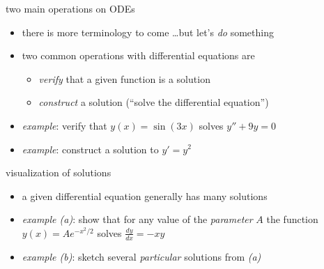 \documentclass{beamer}
\begin{document}
\begin{frame}{two main operations on ODEs}

\begin{itemize}
\item there is more terminology to come \dots but let's \emph{do} something
\item two common operations with differential equations are
    \begin{itemize}
    \item \emph{verify} that a given function is a solution
    \item \emph{construct} a solution (``solve the differential equation'')
    \end{itemize}

\item \emph{example}:  verify that $y(x) = \sin(3 x)$ solves $y''+9y=0$

\vspace{10mm}
\item \emph{example}:  construct a solution to $y'=y^2$

\vspace{30mm}
\end{itemize}
\end{frame}

\begin{frame}{visualization of solutions}

\begin{itemize}
\item a given differential equation generally has many solutions
\item \emph{example (a)}: show that for any value of the \emph{parameter} $A$ the function $y(x) = A e^{-x^2/2}$ solves $\frac{dy}{dx} = - x y$

\vspace{15mm}
\item \emph{example (b)}: sketch several \emph{particular} solutions from \emph{(a)}

\vspace{25mm}

\phantom{foo}
\end{itemize}
\end{frame}
\end{document}
